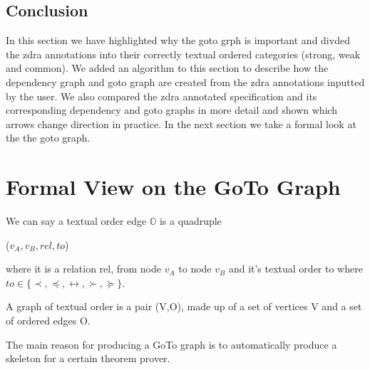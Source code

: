 \subsection{Conclusion}

In this section we have highlighted why the goto grph is important and divded the \gls{zdra} annotations into their correctly textual ordered categories (strong, weak and common). We added an algorithm to this section to describe how the dependency graph and goto graph are created from the \gls{zdra} annotations inputted by the user. We also compared the \gls{zdra} annotated specification and its corresponding dependency and goto graphs in more detail and shown which arrows change direction in practice. In the next section we take a formal look at the the goto graph.

\section{Formal View on the GoTo Graph}

\begin{defin}
We can say a textual order edge $\mathbb{O}$ is a quadruple
\begin{center}
($v_{A}, v_{B}, rel, to$)
\end{center}
where it is a relation rel, from node $v_{A}$ to node $v_{B}$ and it's textual order to where $to \in \{\prec , \preceq , \leftrightarrow , \succ , \succeq \}$.
\end{defin}

\begin{defin}
A graph of textual order is a pair (V,O), made up of a set of vertices V and a set of ordered edges O.
\end{defin}

The main reason for producing a GoTo graph is to automatically produce a skeleton for a certain theorem prover.


